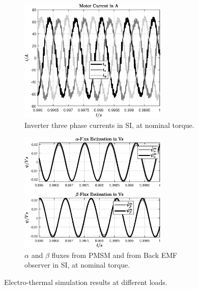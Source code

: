 \documentclass[11pt,a4paper,oneside]{book}
\numberwithin{equation}{section}
\theoremstyle{it}
\theoremstyle{definition}
\begin{document}
\begin{figure}[H]
	\centering
	\begin{subfigure}{0.5\textwidth}
		\centering
		\includegraphics[width = 200pt, angle = 0, 
		keepaspectratio]{figures/thermal_analysis/case_1/sim_results_fig_3.eps}
		\captionsetup{width=0.5\textwidth, font=footnotesize}	
		\caption{Inverter three phase currents in SI, at nominal torque. \vspace{2mm}}
		\label{}
	\end{subfigure}%
	\begin{subfigure}{.5\textwidth}
		\centering
		\includegraphics[width = 200pt, angle = 0, 
		keepaspectratio]{figures/thermal_analysis/case_1/sim_results_fig_4.eps}
		\captionsetup{width=0.5\textwidth, font=footnotesize}	
		\caption{$\alpha$ and $\beta$ fluxes from PMSM and from Back EMF observer in SI, at nominal torque.}
		\label{}
	\end{subfigure}
	\captionsetup{width=0.5\textwidth, font=small}	
	\caption{Electro-thermal simulation results at different loads.}
	\label{}
\end{figure}
\end{document}
